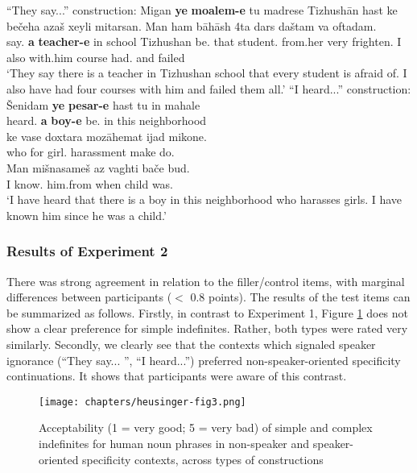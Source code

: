 \documentclass[output=paper]{langsci/langscibook}
\begin{document}
\begin{exe}
\ex\label{4ex:35}
``They say...'' construction:
\exi{}
\gll	Migan {\bf{ye}} {\bf{moalem-e}} tu madrese Tizhushān hast ke bečeha azaš xeyli mitarsan. Man ham bāhāsh 4ta dars daštam va oftadam. \\
	say.{} {\bf{a}} {\bf{teacher-e}} in school Tizhushan be.{} that	 student.{} from.her very frighten.{} I also with.him {} course had.{} and failed \\
\glt	`They say there is a teacher in Tizhushan school that every student is afraid of. I also have had four courses with him and failed them all.'
\filbreak
\ex\label{4ex:36}
``I heard...'' construction:
\exi{}
\gll Šenidam {\bf{ye}} {\bf{pesar-e}} hast tu in mahale \\
heard.{} {\bf{a}} {\bf{boy-e}} be.{} in this neighborhood \\
\glt
\exi{}
\gll ke vase doxtara mozāhemat ijad mikone. \\
who for girl.{} harassment make do.{} \\
\glt
\exi{}
\gll Man mišnasameš az vaghti bače bud. \\
I know.{} him.from when child was.{} \\
\glt `I have heard that there is a boy in this neighborhood who harasses girls. I have known him since he was a child.'


\end{exe}

\subsubsection{Results of Experiment 2}\label{4sec:522}
There was strong agreement in relation to the filler/control items, with marginal differences between participants ($<$ 0.8 points). The results of the test items can be summarized as follows. Firstly, in contrast to Experiment 1, Figure \ref{4fig:3} does not show a clear preference for simple indefinites. Rather, both types were rated very similarly. Secondly, we clearly see that the contexts which signaled speaker ignorance (``They say... '', ``I heard...'') preferred non-speaker-oriented specificity continuations. It shows that participants were aware of this contrast.

\vspace*{-3mm}
\begin{figure}[H]
\centering
\texttt{[image: chapters/heusinger-fig3.png]}
\caption{Acceptability (1 = very good; 5 = very bad) of simple and complex indefinites for human noun phrases in non-speaker and speaker-oriented specificity contexts, across types of constructions}\label{4fig:3}
\end{figure}
\end{document}
